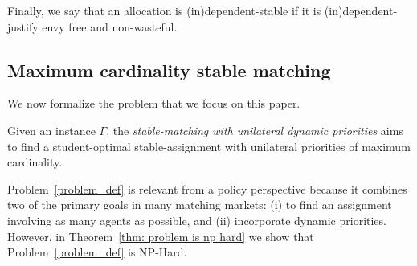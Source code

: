     Finally, we say that an allocation is (in)dependent-stable if it is (in)dependent-justify envy free and non-wasteful.

\subsection{Maximum cardinality stable matching}
    We now formalize the problem that we focus on this paper.
    \begin{problem}\label{problem_def}
    Given an instance $\Gamma$, the \emph{stable-matching with unilateral dynamic priorities} aims to find a student-optimal stable-assignment with unilateral priorities of maximum cardinality.
    \end{problem}
    Problem~\ref{problem_def} is relevant from a policy perspective because it combines two of the primary goals in many matching markets: (i) to find an assignment involving as many agents as possible, and (ii) incorporate dynamic priorities. However, in Theorem~\ref{thm: problem is np hard} we show that Problem~\ref{problem_def} is NP-Hard.

